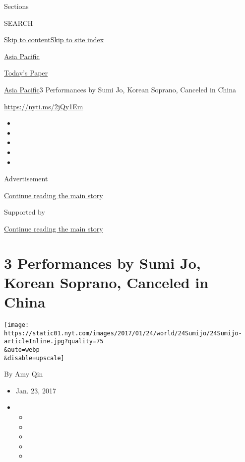 Sections

SEARCH

\protect\hyperlink{site-content}{Skip to
content}\protect\hyperlink{site-index}{Skip to site index}

\href{https://www.nytimes.com/section/world/asia}{Asia Pacific}

\href{https://myaccount.nytimes.com/auth/login?response_type=cookie\&client_id=vi}{}

\href{https://www.nytimes.com/section/todayspaper}{Today's Paper}

\href{/section/world/asia}{Asia Pacific}\textbar{}3 Performances by Sumi
Jo, Korean Soprano, Canceled in China

\url{https://nyti.ms/2jQy1Em}

\begin{itemize}
\item
\item
\item
\item
\item
\end{itemize}

Advertisement

\protect\hyperlink{after-top}{Continue reading the main story}

Supported by

\protect\hyperlink{after-sponsor}{Continue reading the main story}

\hypertarget{3-performances-by-sumi-jo-korean-soprano-canceled-in-china}{%
\section{3 Performances by Sumi Jo, Korean Soprano, Canceled in
China}\label{3-performances-by-sumi-jo-korean-soprano-canceled-in-china}}

\texttt{[image: https://static01.nyt.com/images/2017/01/24/world/24Sumijo/24Sumijo-articleInline.jpg?quality=75\\\&auto=webp\\\&disable=upscale]}

By Amy Qin

\begin{itemize}
\item
  Jan. 23, 2017
\item
  \begin{itemize}
  \item
  \item
  \item
  \item
  \item
  \end{itemize}
\end{itemize}

